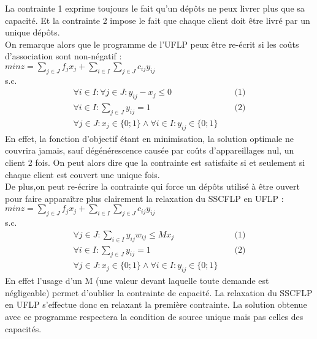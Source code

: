 \documentclass[12pt,a4paper]{article}
\begin{document}
La contrainte 1 exprime toujours le fait qu'un dépôts ne peux livrer plus que sa capacité. Et la contrainte 2 impose le fait que chaque client doit être livré par un unique dépôts.\\

On remarque alors que le programme de l'UFLP peux être re-écrit si les coûts d'association sont non-négatif :\\
$min z = \sum \limits_{j \in J} f_j x_j + \sum \limits_{i \in I} \sum \limits_{j \in J} c_{ij} y_{ij}$\\
s.c.
\begin{align*}
 \forall i \in I : \forall j \in J : y_{ij} - x_j \leqslant 0 & & \text{ (1)} \\
 \forall i \in I : \sum \limits_{j \in J} y_{ij} = 1 & & \text{ (2)} \\
 \forall j \in J : x_j \in \{0;1\} \land \forall i \in I  : y_{ij} \in \{0;1\} 
\end{align*}
En effet, la fonction d’objectif étant en minimisation, la solution optimale ne couvrira jamais, sauf dégénérescence causée par coûts d’appareillages nul, un client 2 fois. On peut alors dire que la contrainte est satisfaite si et seulement si chaque client est couvert une unique fois.\\
De plus,on peut re-écrire la contrainte qui force un dépôts utilisé à être ouvert pour faire apparaître plus clairement la relaxation du SSCFLP en UFLP :\\
$min z = \sum \limits_{j \in J} f_j x_j + \sum \limits_{i \in I} \sum \limits_{j \in J} c_{ij} y_{ij}$\\
s.c.
\begin{align*}
 \forall j \in J : \sum \limits_{i \in I} y_{ij} w_{ij} \leqslant M x_j & & \text{ (1)} \\
 \forall i \in I : \sum \limits_{j \in J} y_{ij} = 1 & & \text{ (2)} \\
 \forall j \in J : x_j \in \{0;1\} \land \forall i \in I  : y_{ij} \in \{0;1\} 
\end{align*}
En effet l'usage d'un M (une valeur devant laquelle toute demande est négligeable) permet d'oublier la contrainte de capacité. La relaxation du SSCFLP en UFLP s’effectue donc en relaxant la première contrainte. La solution obtenue avec ce programme respectera la condition de source unique mais pas celles des capacités.\\
\end{document}
